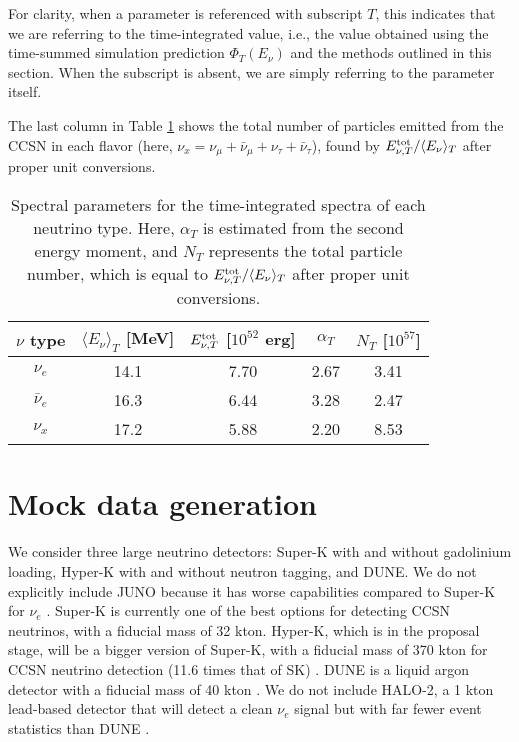 \documentclass[aps,reprint,superscriptaddress]{revtex4-1}
\begin{document}
For clarity, when a parameter is referenced with subscript $T$, this indicates that we are referring to the time-integrated value, i.e., the value obtained using the time-summed simulation prediction $\Phi_{T}(E_{\nu})$ and the methods outlined in this section. When the subscript is absent, we are simply referring to the parameter itself. 

The last column in Table \ref{tab:simDataTable} shows the total number of particles emitted from the  CCSN  in each flavor (here, $\nu_{x} =  \nu_{\mu} + \bar\nu_{\mu} + \nu_{\tau} + \bar\nu_{\tau}$), found by $E_{\nu,T}^{\rm tot}/\langle E_{\nu}\rangle_T$ after proper unit conversions.


\begin{table}
\centering
\begin{tabular}{ccccc}
\hline \hline $\nu$ type & $\langle E_{\nu}\rangle_T$ [MeV] & $E_{\nu,T}^{\rm tot}$ [$10^{52}$ erg] & $\alpha_T$ & $N_T$ [$10^{57}$] \\
\hline $\nu_{e}$ & 14.1 & 7.70 & 2.67 & 3.41 \\
$\bar{\nu}_{e}$ & 16.3 & 6.44 & 3.28 & 2.47 \\
$\nu_{x}$ & 17.2 & 5.88 & 2.20 & 8.53 \\
\hline \hline
\end{tabular}
\caption{Spectral parameters for the time-integrated spectra of each neutrino type.  Here, $\alpha_T$ is estimated from the second energy moment, and $N_T$ represents the total particle number, which is equal to $E_{\nu,T}^{\rm tot}/\langle E_{\nu}\rangle_T$ after proper unit conversions.}
\label{tab:simDataTable}
\end{table}

\section{Mock data generation} \label{sec:mockData}

We consider three large neutrino detectors: Super-K with and without gadolinium loading, Hyper-K with and without neutron tagging, and DUNE.  We do not explicitly include JUNO because it has worse capabilities compared to Super-K for $\nu_e$ \cite{Laha:2014yua,Fischer:2015oma,Lu:2016ipr}.  Super-K is currently one of the best options for detecting CCSN  neutrinos, with a fiducial mass of 32 kton. Hyper-K, which is in the proposal stage, will be a bigger version of Super-K, with a fiducial mass of 370 kton for CCSN neutrino detection (11.6 times that of SK) \cite{Hyper-Kamiokande:2016dsw}. DUNE is a liquid argon detector with a fiducial mass of 40 kton \cite{Ankowski:2016lab,Acciarri:2016ooe}. We do not include HALO-2, a 1 kton lead-based detector that will detect a clean $\nu_e$ signal but with far fewer event statistics than DUNE \cite{Duba:2008zz,Vaananen:2011bf}.
\end{document}

